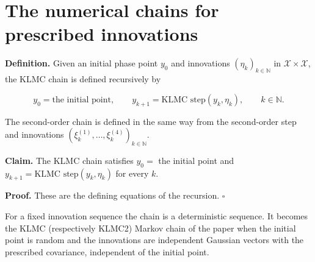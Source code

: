 \documentclass[11pt,a4paper]{article}
\begin{document}
\section{\texorpdfstring{The numerical chains for prescribed innovations}{The numerical chains for prescribed innovations}}


\textbf{Definition.} Given an initial phase point \(y_0\) and innovations \((\eta_k)_{k\in\mathbb N}\) in \(\mathcal X\times\mathcal X\), the KLMC chain is defined recursively by


\[y_0=\text{the initial point},\qquad y_{k+1}=\text{KLMC step}(y_k,\eta_k),\qquad k\in\mathbb N .\]


The second-order chain is defined in the same way from the second-order step and innovations \((\xi_k^{(1)},\dots,\xi_k^{(4)})_{k\in\mathbb N}\).




\textbf{Claim.} The KLMC chain satisfies \(y_0=\) the initial point and \(y_{k+1}=\text{KLMC step}(y_k,\eta_k)\) for every \(k\).




\textbf{Proof.} These are the defining equations of the recursion. \(\square\)




For a fixed innovation sequence the chain is a deterministic sequence. It becomes the KLMC (respectively KLMC2) Markov chain of the paper when the initial point is random and the innovations are independent Gaussian vectors with the prescribed covariance, independent of the initial point.
\end{document}
